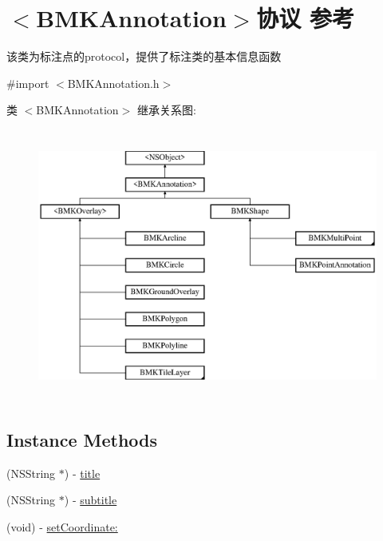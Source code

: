 \hypertarget{protocol_b_m_k_annotation-p}{}\section{$<$B\+M\+K\+Annotation$>$协议 参考}
\label{protocol_b_m_k_annotation-p}


该类为标注点的protocol，提供了标注类的基本信息函数  




{\ttfamily \#import $<$B\+M\+K\+Annotation.\+h$>$}

类 $<$B\+M\+K\+Annotation$>$ 继承关系图\+:\begin{figure}[H]
\begin{center}
\leavevmode
\includegraphics[height=9.000000cm]{protocol_b_m_k_annotation-p}
\end{center}
\end{figure}
\subsection*{Instance Methods}
\begin{DoxyCompactItemize}
\item 
(N\+S\+String $\ast$) -\/ \hyperlink{protocol_b_m_k_annotation-p_a249e1b880f8ded8541a0fe59ef4abb12}{title}
\item 
(N\+S\+String $\ast$) -\/ \hyperlink{protocol_b_m_k_annotation-p_a62aea71f4631251330e8a6fc3d3bdf11}{subtitle}
\item 
(void) -\/ \hyperlink{protocol_b_m_k_annotation-p_a86db1788af78d273e1e155d3aa3d978f}{set\+Coordinate\+:}
\end{DoxyCompactItemize}
